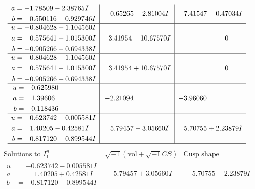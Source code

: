 \documentclass[1p]{elsarticle_modified}
\theoremstyle{definition}
\newcommand{\I}{\sqrt{-1}}
\begin{document}
$$\begin{array}{c|c|c}
\begin{aligned}
a &= -1.78509 - 2.38765 I \\
b &= \phantom{-}0.550116 - 0.929746 I\end{aligned}
 & -0.65265 - 2.81004 I & -7.41547 - 0.47034 I \\ \hline\begin{aligned}
u &= -0.804628 + 1.104560 I \\
a &= \phantom{-}0.575641 + 1.015300 I \\
b &= -0.905266 - 0.694338 I\end{aligned}
 & \phantom{-}3.41954 - 10.67570 I & \phantom{-0.000000 } 0 \\ \hline\begin{aligned}
u &= -0.804628 - 1.104560 I \\
a &= \phantom{-}0.575641 - 1.015300 I \\
b &= -0.905266 + 0.694338 I\end{aligned}
 & \phantom{-}3.41954 + 10.67570 I & \phantom{-0.000000 } 0 \\ \hline\begin{aligned}
u &= \phantom{-}0.625980\phantom{ +0.000000I} \\
a &= \phantom{-}1.39606\phantom{ +0.000000I} \\
b &= -0.118436\phantom{ +0.000000I}\end{aligned}
 & -2.21094\phantom{ +0.000000I} & -3.96060\phantom{ +0.000000I} \\ \hline\begin{aligned}
u &= -0.623742 + 0.005581 I \\
a &= \phantom{-}1.40205 - 0.42581 I \\
b &= -0.817120 + 0.899544 I\end{aligned}
 & \phantom{-}5.79457 - 3.05660 I & \phantom{-}5.70755 + 2.23879 I\\
 \hline 
 \end{array}$$\newpage$$\begin{array}{c|c|c}  
\text{Solutions to }I^u_{1}& \I (\text{vol} + \sqrt{-1}CS) & \text{Cusp shape}\\
 \hline 
\begin{aligned}
u &= -0.623742 - 0.005581 I \\
a &= \phantom{-}1.40205 + 0.42581 I \\
b &= -0.817120 - 0.899544 I\end{aligned}
 & \phantom{-}5.79457 + 3.05660 I & \phantom{-}5.70755 - 2.23879 I \\ \hline\begin{aligned}

\end{aligned}
\end{array}$$
\end{document}
